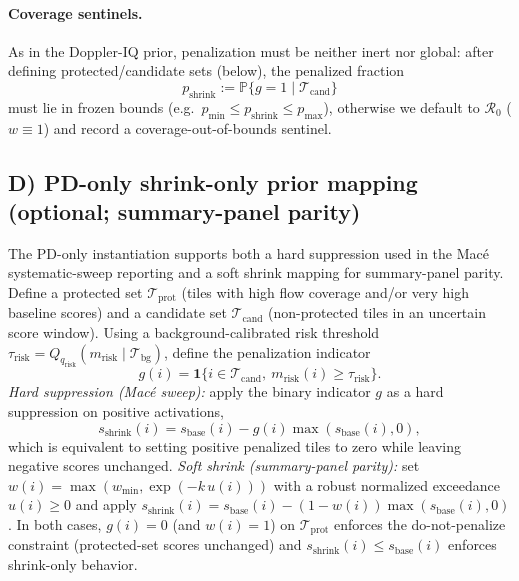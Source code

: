 \documentclass[11pt]{article}
\begin{document}
\paragraph{Coverage sentinels.}
As in the Doppler-IQ prior, penalization must be neither inert nor global: after defining protected/candidate sets (below), the penalized fraction
\[
p_{\mathrm{shrink}} := \mathbb{P}\{g=1\mid \mathcal{T}_{\mathrm{cand}}\}
\]
must lie in frozen bounds (e.g.\ $p_{\min}\le p_{\mathrm{shrink}}\le p_{\max}$), otherwise we default to $\mathcal{R}_0$ ($w\equiv 1$) and record a coverage-out-of-bounds sentinel.

\subsection*{D) PD-only shrink-only prior mapping (optional; summary-panel parity)}
The PD-only instantiation supports both a hard suppression used in the Mac{\'e} systematic-sweep reporting and a soft shrink mapping for summary-panel parity.
Define a protected set $\mathcal{T}_{\mathrm{prot}}$ (tiles with high flow coverage and/or very high baseline scores) and a candidate set $\mathcal{T}_{\mathrm{cand}}$ (non-protected tiles in an uncertain score window). Using a background-calibrated risk threshold $\tau_{\mathrm{risk}}=Q_{q_{\mathrm{risk}}}(m_{\mathrm{risk}}\mid\mathcal{T}_{\mathrm{bg}})$, define the penalization indicator
\[
g(i)=\mathbf{1}\{i\in\mathcal{T}_{\mathrm{cand}},\ m_{\mathrm{risk}}(i)\ge\tau_{\mathrm{risk}}\}.
\]
\emph{Hard suppression (Mac{\'e} sweep):} apply the binary indicator $g$ as a hard suppression on positive activations,
\[
s_{\mathrm{shrink}}(i)=s_{\mathrm{base}}(i) - g(i)\max(s_{\mathrm{base}}(i),0),
\]
which is equivalent to setting positive penalized tiles to zero while leaving negative scores unchanged. \emph{Soft shrink (summary-panel parity):} set $w(i)=\max(w_{\min},\exp(-k\,u(i)))$ with a robust normalized exceedance $u(i)\ge 0$ and apply $s_{\mathrm{shrink}}(i)=s_{\mathrm{base}}(i)-(1-w(i))\max(s_{\mathrm{base}}(i),0)$. In both cases, $g(i)=0$ (and $w(i)=1$) on $\mathcal{T}_{\mathrm{prot}}$ enforces the do-not-penalize constraint (protected-set scores unchanged) and $s_{\mathrm{shrink}}(i)\le s_{\mathrm{base}}(i)$ enforces shrink-only behavior.
\end{document}
